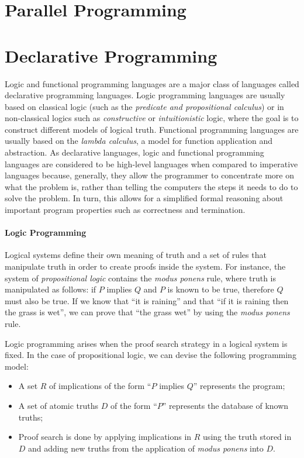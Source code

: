 \section{Parallel Programming}

\section{Declarative Programming}

Logic and functional programming languages are a major class of languages called
declarative programming languages. Logic programming languages are usually based
on classical logic (such as the \emph{predicate and propositional calculus}) or
in non-classical logics such as \emph{constructive} or \emph{intuitionistic}
logic, where the goal is to construct different models of logical truth.
Functional programming languages are usually based on the \emph{lambda
calculus}, a model for function application and abstraction. As declarative
languages, logic and functional programming languages are considered to be
high-level languages when compared to imperative languages because, generally,
they allow the programmer to concentrate more on what the problem is, rather
than telling the computers the steps it needs to do to solve the problem.  In
turn, this allows for a simplified formal reasoning about important program
properties such as correctness and termination.

\paragraph{Logic Programming}

Logical systems define their own meaning of truth and a set of rules that
manipulate truth in order to create proofs inside the system.  For instance, the
system of \emph{propositional logic} contains the \emph{modus ponens} rule,
where truth is manipulated as follows: if $P$ implies $Q$ and $P$ is known to be
true, therefore $Q$ must also be true. If we know that ``it is raining'' and
that ``if it is raining then the grass is wet'', we can prove that ``the grass
wet'' by using the \emph{modus ponens} rule.

Logic programming arises when the proof search strategy in a logical system is
fixed. In the case of propositional logic, we can devise the following
programming model:

\begin{itemize}
   \item A set $R$ of implications of the form ``$P$ implies $Q$'' represents the
      program;
   \item A set of atomic truths $D$ of the form ``$P$'' represents the database of
      known truths;
   \item Proof search is done by applying implications in $R$ using the truth
      stored in $D$ and adding new truths from the application of \emph{modus
      ponens} into $D$.
\end{itemize}

